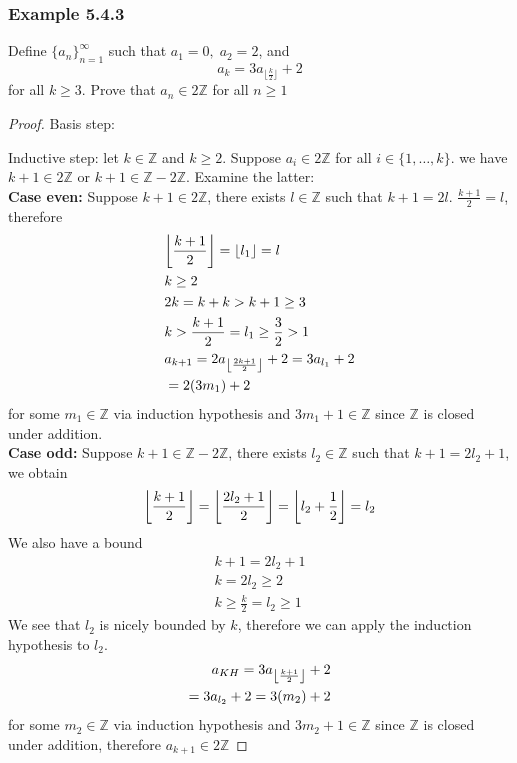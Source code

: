 \documentclass[12pt]{book}
\newcommand{\Z}{\mathbb{Z}}
\newcommand{\odd}[0]{\mathbb{Z} - 2\mathbb{Z}}
\DeclarePairedDelimiter\floor{\lfloor}{\rfloor}
\begin{document}
\subsubsection{Example 5.4.3}
Define $\{ a_n\}_{n=1}^{\infty}$ such that $a_1 =0, \; a_2 = 2$, and 
\[
a_k = 3a_{\lfloor{\frac{k}{2}}\rfloor}+2 
\]
for all $k \geq 3$. Prove that $a_n \in 2\Z$ for all $n \geq 1$
\begin{proof}
    Basis step:
    

    Inductive step: let $k \in \Z$ and $k \geq 2$. Suppose $a_i \in 2\Z$ for all $i \in \{ 1,\ldots,k\}$. we have $k+1 \in 2\Z$ or $k+1 \in \odd$. Examine the latter:\\
    \textbf{Case even:} Suppose $k+1 \in 2\Z$, there exists $l \in \Z$ such that $k+1 = 2l $. $\frac{k+1}{2} = l$, therefore 
    \begin{align*}
    &\floor*{\frac{k+1}{2}} = \floor*{l_1} = l \\
    &k \geq 2\\
    &2k = k+k > k + 1 \geq 3\\
    &k > \frac{k+1}{2} = l_1 \geq \frac{3}{2} >1\\
    &a_{k+1} = 2a_{\floor*{\frac{2k+1}{2}}} + 2 = 3a_{l_1} + 2\\
    &=2(3m_1)+2
    \end{align*}
    for some $m_1 \in \Z$ via induction hypothesis and $3m_1 +1\in \Z$ since $\Z$ is closed under addition.\\
    \textbf{Case odd:} Suppose $k + 1 \in \odd$, there exists $l_2 \in \Z$ such that $k+1 = 2l_2 +1$, we obtain
    \[
    \floor*{\frac{k+1}{2}} = \floor*{\frac{2l_2+1}{2}} = \floor*{l_2 + \frac{1}{2}} = l_2
    \]
    We also have a bound
    \begin{align*}
        k+1 = 2l_2 + 1\\
        k = 2l_2 \geq 2\\
        k \geq \frac{k}{2} = l_2 \geq 1
    \end{align*}
    We see that $l_2$ is nicely bounded by $k$, therefore we can apply the induction hypothesis to $l_2$.
    \begin{align*}
        a_{KH} = 3a_{\floor*{\frac{k+1}{2}}} + 2\\
        = 3a_{l_2}+2 = 3(m_2)+2
    \end{align*}
    for some $m_2 \in \Z$ via induction hypothesis and $3m_2+1\in \Z$ since $\Z$ is closed under addition, therefore $a_{k+1}\in 2\Z$
    
\end{proof}
\end{document}
